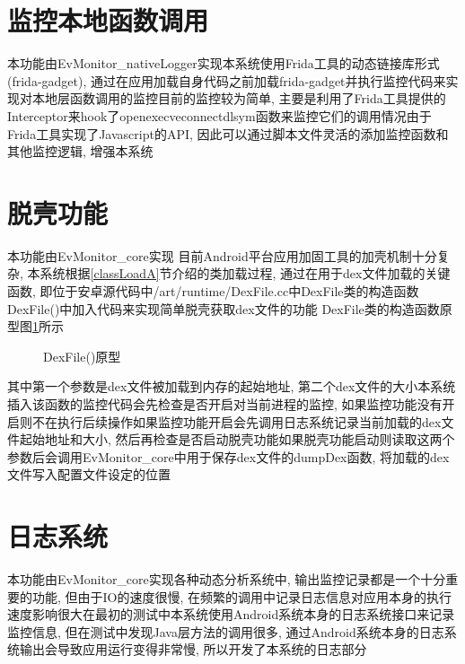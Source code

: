 \section{监控本地函数调用}
本功能由EvMonitor\_nativeLogger实现\juhao 本系统使用Frida工具的动态链接库形式(frida-gadget), 通过在应用加载自身代码之前加载frida-gadget并执行监控代码来实现对本地层函数调用的监控\juhao 目前的监控较为简单, 主要是利用了Frida工具提供的Interceptor来hook了open\dunhao execve\dunhao connect\dunhao dlsym函数来监控它们的调用情况\juhao 由于Frida工具实现了Javascript的API, 因此可以通过脚本文件灵活的添加监控函数和其他监控逻辑, 增强本系统\juhao 


\section{脱壳功能}
本功能由EvMonitor\_core实现\juhao 
目前Android平台应用加固工具的加壳机制十分复杂, 本系统根据\ref{classLoadA}节介绍的类加载过程, 通过在用于dex文件加载的关键函数, 即位于安卓源代码中/art/runtime/DexFile.cc中DexFile类的构造函数DexFile()中加入代码来实现简单脱壳获取dex文件的功能\juhao 
DexFile类的构造函数原型图\ref{dexFileCode}所示\juhao 
\begin{figure}[ht]
	\centering
	\caption{DexFile()原型}
	\label{dexFileCode}
\end{figure}
其中第一个参数是dex文件被加载到内存的起始地址, 第二个dex文件的大小\juhao 本系统插入该函数的监控代码会先检查是否开启对当前进程的监控, 如果监控功能没有开启则不在执行后续操作\juhao 如果监控功能开启会先调用日志系统记录当前加载的dex文件起始地址和大小, 然后再检查是否启动脱壳功能\juhao 如果脱壳功能启动则读取这两个参数后会调用EvMonitor\_core中用于保存dex文件的dumpDex函数, 将加载的dex文件写入配置文件设定的位置\juhao 


\section{日志系统}
本功能由EvMonitor\_core实现\juhao 各种动态分析系统中, 输出监控记录都是一个十分重要的功能, 但由于IO的速度很慢, 在频繁的调用中记录日志信息对应用本身的执行速度影响很大\juhao 在最初的测试中本系统使用Android系统本身的日志系统接口来记录监控信息, 但在测试中发现Java层方法的调用很多, 通过Android系统本身的日志系统输出会导致应用运行变得非常慢, 所以开发了本系统的日志部分\juhao 

